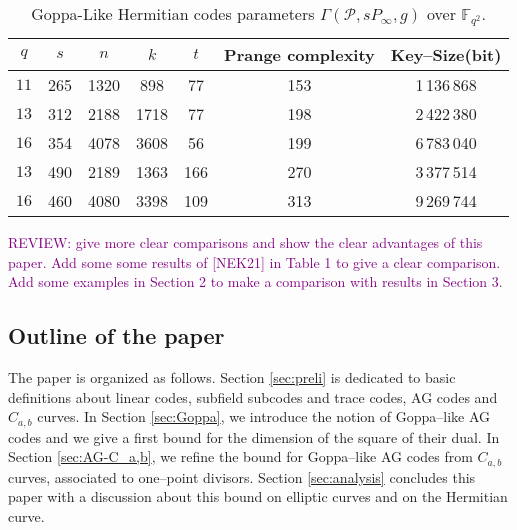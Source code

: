 \documentclass[a4paper]{amsart}
\theoremstyle{definition}
\theoremstyle{remark}
\newcommand{\calP}{\mathcal{P}}
\newcommand{\F}{\mathbb{F}}
\newcommand\jade[1]{\textcolor{purple}{#1}}
\begin{document}
\begin{table}[h]
	\begin{center}
		\begin{tabular}{|c|c|c|c|c|c|c|}
			\hline
			$q$&  $s$ & $n$ & $k$ & $t$ & Prange complexity & Key--Size(bit)\\
			\hline \hline
			
		${11}$	&265&1320& 898& 77& 153& 1\,136\,868 \\
		
			\hline \hline
			${13}$&312&2188& 1718& 77& 198& 2\,422\,380  \\
			
			\hline 
		${16}$&354& 4078& 3608& 56& 199& 6\,783\,040   \\
		
			\hline \hline
		${13}$& 490& 2189& 1363& 166& 270& 3\,377\,514 \\
		
			\hline 
			${16}$& 460 &4080& 3398& 109& 313& 9\,269\,744\\
			\hline
		\end{tabular}
		\vspace*{0.3em}
		\caption{Goppa-Like Hermitian codes parameters $\Gamma(\calP,sP_\infty,g)$ over $\F_{q^2}$.} \label{table:goppa-herm}
	\end{center}
\end{table}

\jade{REVIEW: give more clear comparisons and show the clear advantages of this paper.
	Add some some results of [NEK21] in Table 1 to give a clear comparison. Add
	some examples in Section 2 to make a comparison with results in Section 3.}


\subsection*{Outline of the paper}

The paper is organized as follows. Section \ref{sec:preli} is dedicated to basic definitions about linear codes, subfield subcodes and trace codes, AG codes and $C_{a,b}$ curves. In Section \ref{sec:Goppa}, we introduce the notion of Goppa--like AG codes and we give a first bound for the dimension of the square of their dual. In Section \ref{sec:AG-C_a,b}, we refine the bound for Goppa--like AG codes from $C_{a,b}$ curves, associated to one--point divisors. Section \ref{sec:analysis} concludes this paper with a discussion about this bound on elliptic curves and on the Hermitian curve.
\end{document}
